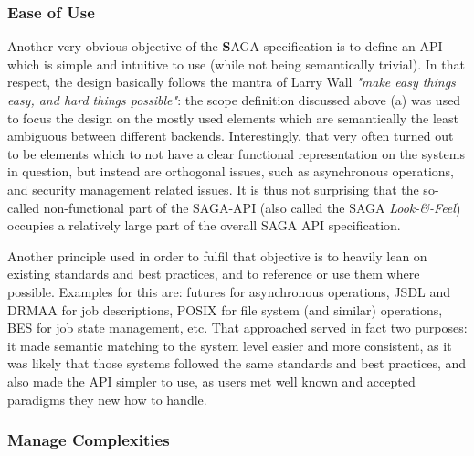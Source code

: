 \documentclass[a4paper,12pt]{article}
\newcommand{\I}[1]{\textit{#1}}
\newcommand{\B}[1]{\textbf{#1}}
\begin{document}
   \subsubsection*{Ease of Use}


    Another very obvious objective of the \B{S}AGA specification is to
    define an API which is simple and intuitive to use (while not
    being semantically trivial).  In that respect, the design
    basically follows the mantra of Larry Wall \I{"make easy things
    easy, and hard things possible"}: the scope definition discussed
    above (a) was used to focus the design on the mostly used elements
    which are semantically the least ambiguous between different
    backends.  Interestingly, that very often turned out to be
    elements which to not have a clear functional representation on
    the systems in question, but instead are orthogonal issues, such
    as asynchronous operations, and security management related
    issues.  It is thus not surprising that the so-called
    non-functional part of the SAGA-API (also called the SAGA
    \I{Look-\&-Feel}) occupies a relatively large part of the overall
    SAGA API specification.

    Another principle used in order to fulfil that objective is to
    heavily lean on existing standards and best practices, and to
    reference or use them where possible.  Examples for this are:
    futures for asynchronous operations, JSDL and DRMAA for job
    descriptions, POSIX for file system (and similar) operations, BES
    for job state management, etc.  That approached served in fact two
    purposes: it made semantic matching to the system level easier and
    more consistent, as it was likely that those systems followed the
    same standards and best practices, and also made the API simpler
    to use, as users met well known and accepted paradigms they new
    how to handle.


   \subsubsection*{Manage Complexities}

    
\end{document}
